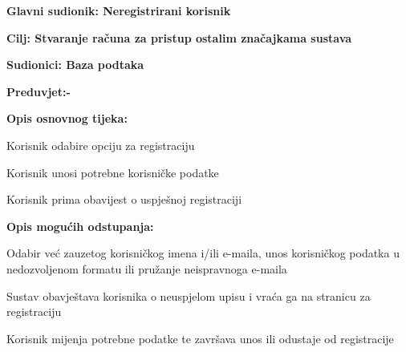					
					\noindent {}
					\begin{packed_item}
						
						\item \textbf{Glavni sudionik: Neregistrirani korisnik}
						\item  \textbf{Cilj: Stvaranje računa za pristup ostalim značajkama sustava}  
						\item  \textbf{Sudionici: Baza podtaka} 
						\item  \textbf{Preduvjet:-} 
						\item  \textbf{Opis osnovnog tijeka:}
						
						\item[] \begin{packed_enum}
							
							\item Korisnik odabire opciju za registraciju
							\item Korisnik unosi potrebne korisničke podatke
							\item Korisnik prima obavijest o uspješnoj registraciji
						\end{packed_enum}
						
						\item  \textbf{Opis mogućih odstupanja:}
						
						\item[] \begin{packed_item}
							
							\item[2.a] Odabir već zauzetog korisničkog imena i/ili e-maila, unos korisničkog podatka u nedozvoljenom formatu ili pružanje neispravnoga e-maila
							\item[] \begin{packed_enum}
								
								\item  Sustav obavještava korisnika o neuspjelom upisu i vraća ga na stranicu za registraciju
								\item Korisnik mijenja potrebne podatke te završava unos ili odustaje od registracije
								
							\end{packed_enum}
							
						\end{packed_item}
					\end{packed_item}
					
